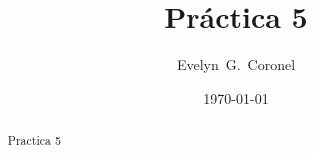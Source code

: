 



\title{Práctica 5}
\author{Evelyn~G.~Coronel}


\date[]{\lowercase{\today}} %

\begin{abstract}
Practica 5
\end{abstract} 
\maketitle
%




